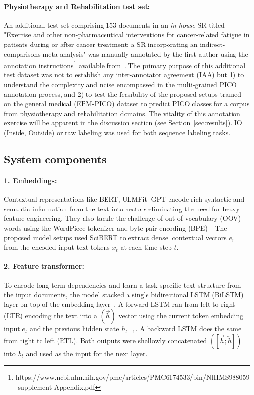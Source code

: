\documentclass[runningheads]{llncs}
\begin{document}
\paragraph{Physiotherapy and Rehabilitation test set: }
%
An additional test set comprising 153 documents in an \textit{in-house} SR titled "Exercise and other non-pharmaceutical interventions for cancer-related fatigue in patients during or after cancer treatment: a SR incorporating an indirect-comparisons meta-analysis" was manually annotated by the first author using the annotation instructions\footnote{https://www.ncbi.nlm.nih.gov/pmc/articles/PMC6174533/bin/NIHMS988059-supplement-Appendix.pdf} available from~\cite{nye2018corpus,hilfiker2018exercise}.
The primary purpose of this additional test dataset was not to establish any inter-annotator agreement (IAA) but 1) to understand the complexity and noise encompassed in the multi-grained PICO annotation process, and 2) to test the feasibility of the proposed setups trained on the general medical (EBM-PICO) dataset to predict PICO classes for a corpus from physiotherapy and rehabilitation domains.
The vitality of this annotation exercise will be apparent in the discussion section (see Section~\ref{sec:results}).
IO (Inside, Outside) or raw labeling was used for both sequence labeling tasks.
%
\subsection{System components}\label{subsec:sys_comp}
%
\paragraph{1. Embeddings:}
%
Contextual representations like BERT, ULMFit, GPT encode rich syntactic and semantic information from the text into vectors eliminating the need for heavy feature engineering.
They also tackle the challenge of out-of-vocabulary (OOV) words using the WordPiece tokenizer and byte pair encoding (BPE)~\cite{devlin2018bert,joshi2019comparison}.
The proposed model setups used SciBERT to extract dense, contextual vectors $e_{t}$ from the encoded input text tokens $x_{t}$ at each time-step $t$.
%
\paragraph{2. Feature transformer:}
%
To encode long-term dependencies and learn a task-specific text structure from the input documents, the model stacked a single bidirectional LSTM (BiLSTM) layer on top of the embedding layer~\cite{hochreiter1997long}.
A forward LSTM ran from left-to-right (LTR) encoding the text into a $(\overrightarrow{h})$ vector using the current token embedding input $e_{t}$ and the previous hidden state $h_{t-1}$.
A backward LSTM does the same from right to left (RTL).
Both outputs were shallowly concatenated $([\overrightarrow{h}; \overleftarrow{h}])$ into $h_{t}$ and used as the input for the next layer.
%
\end{document}
